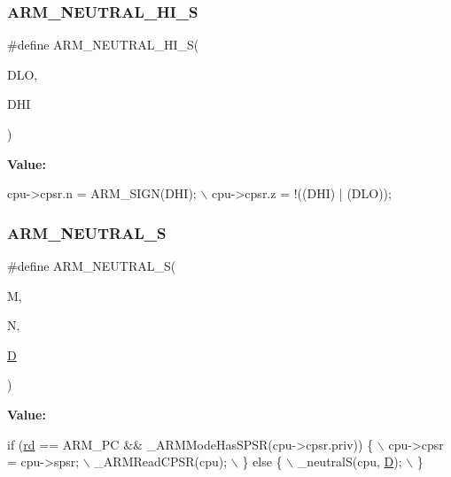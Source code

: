 \subsubsection{\texorpdfstring{A\+R\+M\+\_\+\+N\+E\+U\+T\+R\+A\+L\+\_\+\+H\+I\+\_\+S}{ARM\_NEUTRAL\_HI\_S}}
{\footnotesize\ttfamily \#define A\+R\+M\+\_\+\+N\+E\+U\+T\+R\+A\+L\+\_\+\+H\+I\+\_\+S(\begin{DoxyParamCaption}\item[{}]{D\+LO,  }\item[{}]{D\+HI }\end{DoxyParamCaption})}

{\bfseries Value\+:}
\begin{DoxyCode}
cpu->cpsr.n = ARM\_SIGN(DHI); \(\backslash\)
    cpu->cpsr.z = !((DHI) | (DLO));
\end{DoxyCode}
\mbox{\label{isa-arm_8c_ad836254fbd93d6f5dca83ae0a14b7f73}} 
\subsubsection{\texorpdfstring{A\+R\+M\+\_\+\+N\+E\+U\+T\+R\+A\+L\+\_\+S}{ARM\_NEUTRAL\_S}}
{\footnotesize\ttfamily \#define A\+R\+M\+\_\+\+N\+E\+U\+T\+R\+A\+L\+\_\+S(\begin{DoxyParamCaption}\item[{}]{M,  }\item[{}]{N,  }\item[{}]{\mbox{\hyperlink{_aes_8c_adef282f11138cda3d081cc21280a8d12}{D}} }\end{DoxyParamCaption})}

{\bfseries Value\+:}
\begin{DoxyCode}
\textcolor{keywordflow}{if} (\mbox{\hyperlink{isa-arm_8c_a555541ce18ed9b5fad657a06b22cb465}{rd}} == ARM\_PC && \_ARMModeHasSPSR(cpu->cpsr.priv)) \{ \(\backslash\)
        cpu->cpsr = cpu->spsr; \(\backslash\)
        \_ARMReadCPSR(cpu); \(\backslash\)
    \} \textcolor{keywordflow}{else} \{ \(\backslash\)
        \_neutralS(cpu, \mbox{\hyperlink{_aes_8c_adef282f11138cda3d081cc21280a8d12}{D}}); \(\backslash\)
    \}
\end{DoxyCode}
\mbox{\label{isa-arm_8c_a89c8c7f3e719a849575d2fff43d9d4c1}} 
